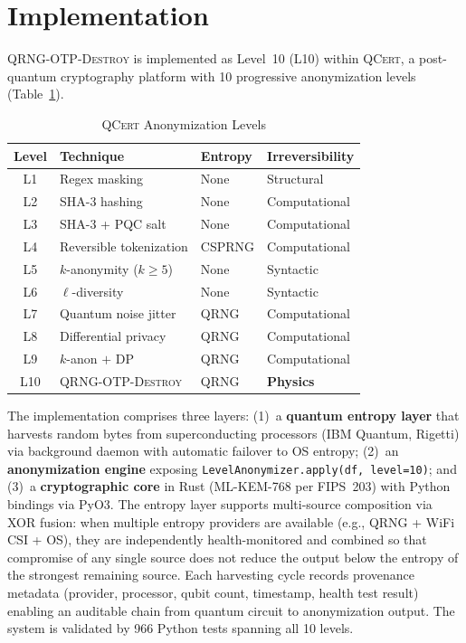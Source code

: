 \documentclass[acmsmall,screen,review,anonymous]{acmart}
\begin{document}
\section{Implementation}
\label{sec:implementation}

\textsc{QRNG-OTP-Destroy} is implemented as Level~10 (L10) within \textsc{QCert}, a post-quantum cryptography platform with 10 progressive anonymization levels (Table~\ref{tab:levels}).

\begin{table}[t]
\caption{\textsc{QCert} Anonymization Levels}
\label{tab:levels}
\begin{center}
\begin{tabular}{@{}clll@{}}
\toprule
\textbf{Level} & \textbf{Technique} & \textbf{Entropy} & \textbf{Irreversibility} \\
\midrule
L1 & Regex masking & None & Structural \\
L2 & SHA-3 hashing & None & Computational \\
L3 & SHA-3 + PQC salt & None & Computational \\
L4 & Reversible tokenization & CSPRNG & Computational \\
L5 & $k$-anonymity ($k{\geq}5$) & None & Syntactic \\
L6 & $\ell$-diversity & None & Syntactic \\
L7 & Quantum noise jitter & QRNG & Computational \\
L8 & Differential privacy & QRNG & Computational \\
L9 & $k$-anon $+$ DP & QRNG & Computational \\
L10 & \textsc{QRNG-OTP-Destroy} & QRNG & \textbf{Physics} \\
\bottomrule
\end{tabular}
\end{center}
\end{table}

The implementation comprises three layers: (1)~a \textbf{quantum entropy layer} that harvests random bytes from superconducting processors (IBM Quantum, Rigetti) via background daemon with automatic failover to OS entropy; (2)~an \textbf{anonymization engine} exposing \texttt{LevelAnonymizer.apply(df, level=10)}; and (3)~a \textbf{cryptographic core} in Rust (ML-KEM-768 per FIPS~203) with Python bindings via PyO3. The entropy layer supports multi-source composition via XOR fusion: when multiple entropy providers are available (e.g., QRNG + WiFi CSI + OS), they are independently health-monitored and combined so that compromise of any single source does not reduce the output below the entropy of the strongest remaining source. Each harvesting cycle records provenance metadata (provider, processor, qubit count, timestamp, health test result) enabling an auditable chain from quantum circuit to anonymization output. The system is validated by 966 Python tests spanning all 10 levels.
\end{document}
